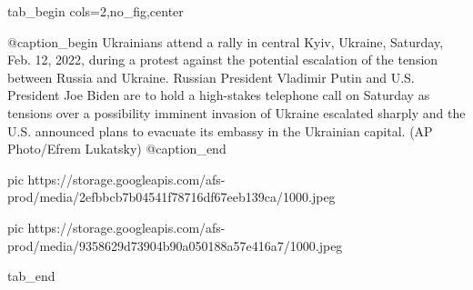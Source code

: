  
 
 
 
 


\ifcmt
  tab_begin cols=2,no_fig,center

		 @caption_begin
Ukrainians attend a rally in central Kyiv, Ukraine, Saturday, Feb. 12, 2022,
during a protest against the potential escalation of the tension between Russia
and Ukraine. Russian President Vladimir Putin and U.S. President Joe Biden are
to hold a high-stakes telephone call on Saturday as tensions over a possibility
imminent invasion of Ukraine escalated sharply and the U.S. announced plans to
evacuate its embassy in the Ukrainian capital. (AP Photo/Efrem Lukatsky)
		 @caption_end

     pic https://storage.googleapis.com/afs-prod/media/2efbbcb7b04541f78716df67eeb139ca/1000.jpeg

		 pic https://storage.googleapis.com/afs-prod/media/9358629d73904b90a050188a57e416a7/1000.jpeg

  tab_end
\fi
